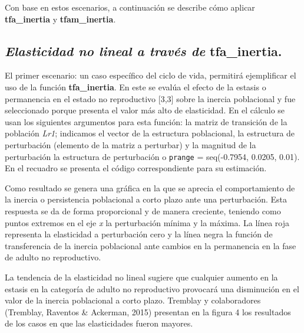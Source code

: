 \documentclass[
  12pt,
  letterpaper,
]{book}
\begin{document}
Con base en estos escenarios, a continuación se describe cómo aplicar
\textbf{tfa\_inertia} y \textbf{tfam\_inertia}.

\subsection{\texorpdfstring{\emph{Elasticidad no lineal a través de}
\textbf{tfa\_inertia}.}{Elasticidad no lineal a través de tfa\_inertia.}}\label{elasticidad-no-lineal-a-travuxe9s-de-tfa_inertia.}

El primer escenario: un caso específico del ciclo de vida, permitirá
ejemplificar el uso de la función \textbf{tfa\_inertia}. En este se
evalúa el efecto de la estasis o permanencia en el estado no
reproductivo {[}3,3{]} sobre la inercia poblacional y fue seleccionado
porque presenta el valor más alto de elasticidad. En el cálculo se usan
los siguientes argumentos para esta función: la matriz de transición de
la población \emph{Lr1}; indicamos el vector de la estructura
poblacional, la estructura de perturbación (elemento de la matriz a
perturbar) y la magnitud de la perturbación la estructura de
perturbación o \texttt{prange} = seq(-0.7954, 0.0205, 0.01). En el
recuadro se presenta el código correspondiente para su estimación.

Como resultado se genera una gráfica en la que se aprecia el
comportamiento de la inercia o persistencia poblacional a corto plazo
ante una perturbación. Esta respuesta se da de forma proporcional y de
manera creciente, teniendo como puntos extremos en el eje \emph{x} la
perturbación mínima y la máxima. La línea roja representa la elasticidad
a perturbación cero y la línea negra la función de transferencia de la
inercia poblacional ante cambios en la permanencia en la fase de adulto
no reproductivo.

La tendencia de la elasticidad no lineal sugiere que cualquier aumento
en la estasis en la categoría de adulto no reproductivo provocará una
disminución en el valor de la inercia poblacional a corto plazo.
Tremblay y colaboradores (Tremblay, Raventos \& Ackerman, 2015)
presentan en la figura 4 los resultados de los casos en que las
elasticidades fueron mayores.
\end{document}
